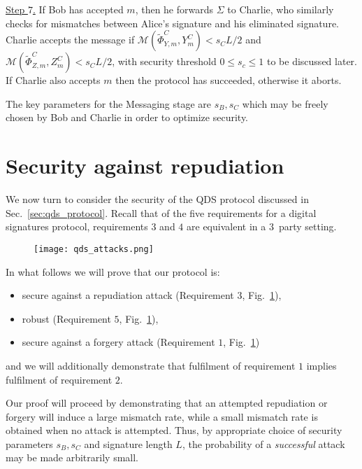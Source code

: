 \noindent \underline{Step $7$.} If Bob has accepted $m$, then he forwards $\Sigma$ to Charlie, who similarly checks for mismatches between Alice's signature and his eliminated signature. Charlie accepts the message if $\mathcal{M}\left(\tilde{\Phi}_{Y, m}^C, Y_m^C\right) < s_C L/2$ and $\mathcal{M}\left(\tilde{\Phi}_{Z, m}^C, Z_m^C\right) < s_C L/2$, with security threshold $0 \le s_c \le 1$ to be discussed later. If Charlie also accepts $m$ then the protocol has succeeded, otherwise it aborts. 

The key parameters for the Messaging stage are $s_B, s_C$ which may be freely chosen by Bob and Charlie in order to optimize security.



\section{Security against repudiation}
We now turn to consider the security of the QDS protocol discussed in Sec.~\ref{sec:qds_protocol}. Recall that of the five requirements for a digital signatures protocol, requirements $3$ and $4$ are equivalent in a $3$~party setting. 

\begin{figure}[htp]
\centering
\texttt{[image: qds\_attacks.png]}
\caption{\label{fig:attacks}}
\end{figure}

In what follows we will prove that our protocol is:
\begin{itemize}
\item secure against a repudiation attack (Requirement $3$, Fig.~\ref{fig:attacks}), 
\item robust (Requirement $5$, Fig.~\ref{fig:attacks}),
\item secure against a forgery attack (Requirement $1$, Fig.~\ref{fig:attacks})
\end{itemize}
and we will additionally demonstrate that fulfilment of requirement $1$ implies fulfilment of requirement $2$. 

Our proof will proceed by demonstrating that an attempted repudiation or forgery will induce a large mismatch rate, while a small mismatch rate is obtained when no attack is attempted. Thus, by appropriate choice of security parameters $s_B, s_C$ and signature length $L$, the probability of a \emph{successful} attack may be made arbitrarily small.

